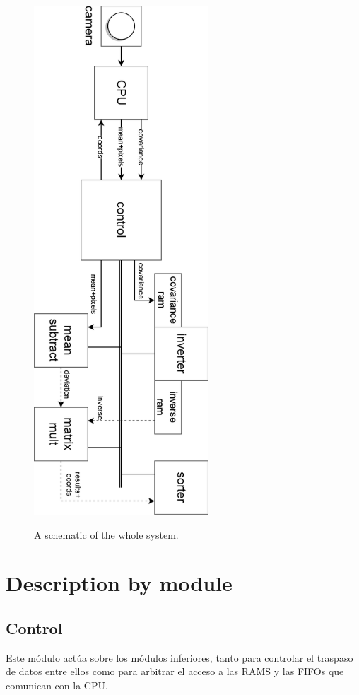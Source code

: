 \begin{figure}
\centering\textbf{
\includegraphics[height=7.5in]{figures/bus.png}}
\caption{A schematic of the whole system.}
  \label{fig:bus}
\end{figure}
\clearpage
\pagebreak

\section{Description by module}
\subsection{Control}
Este módulo actúa sobre los módulos inferiores, tanto para controlar el traspaso de datos entre ellos como para arbitrar el acceso a las RAMS y las FIFOs que comunican con la CPU.

